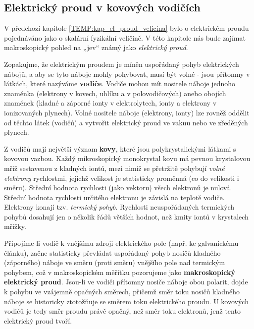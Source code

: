     \subsection{Elektrický proud v kovových vodičích}\label{TEMP:kap_elproud_jev}
      V předchozí kapitole \ref{TEMP:kap_el_proud_velicina} bylo o elektrickém proudu pojednáváno
      jako o skalární fyzikální veličině. V této kapitole nás bude zajímat makroskopický pohled na
      „jev“ známý jako \emph{elektrický proud}.
      
      Zopakujme, že elektrickým proudem je míněn uspořádaný pohyb elektrických ná\-bo\-jů, a aby se
      tyto náboje mohly pohybovat, musí být volné - jsou přítomny v látkách, které nazýváme
      \textbf{vodiče}. Vodiče mohou mít nositele náboje jednoho znaménka (elektrony v kovech,
      uhlíku a v polovodičových) anebo obojích znamének (kladné a záporné ionty v elektrolytech,
      ionty a elektrony v ionizovaných plynech). Volné nositele náboje (elektrony, ionty) lze
      rovněž oddělit od těchto látek (vodičů) a vytvořit elektrický proud ve vakuu nebo ve
      zředěných plynech.
      
      Z vodičů mají největší význam \textbf{kovy}, které jsou polykrystalickými látkami s kovovou
      vazbou. Každý mikroskopický monokrystal kovu má pevnou krystalovou mříž sestavenou z kladných
      iontů, mezi nimiž se přetržitě pohybují \emph{volné elektrony} rychlost\-mi, jejichž velikost
      je statisticky proměnná (co do velikosti i směru). Střední hodnota rychlosti (jako vektoru)
      všech elektronů je nulová. Střední hodnota rychlosti určitého elektronu je závislá na teplotě
      vodiče. Elektrony konají tzv. \emph{termický pohyb}. Rychlosti neuspořádaných termických
      pohybů dosahují jen o několik řádů větších hodnot, než kmity iontů v krystalech mřížky.


      
      Připojíme-li vodič k vnějšímu zdroji elektrického pole (např. ke galvanickému článku), začne
      statisticky převládat uspořádaný pohyb nosičů kladného (záporného) náboje ve směru (proti
      směru) vnějšího pole nad termickým pohybem, což v makroskopickém měřít\-ku pozorujeme jako
      \textbf{makroskopický elektrický proud}. Jsou-li ve vodiči přítomny nosiče náboje obou
      polarit, dojde k pohybu ve vzájemně opačných směrech, přičemž směr toku nosičů kladného
      náboje se historicky ztotožňuje se směrem toku elektrického proudu. U kovových vodičů je tedy
      směr proudu právě opačný, než směr toku elektronů, jenž tento elektrický proud tvoří.
      
